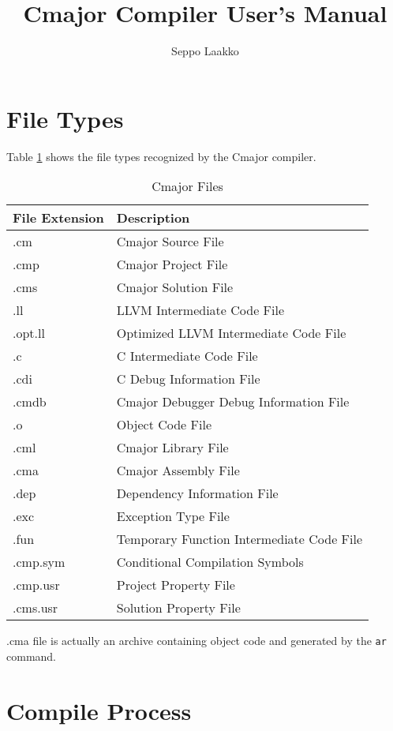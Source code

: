 \documentclass[oneside, a4paper, 11pt]{article}
\begin{document}
\title{Cmajor Compiler User's Manual}
\author{Seppo Laakko}
\maketitle

\section{File Types}

Table \ref{tab:files} shows the file types recognized by the Cmajor compiler.

\begin{table}[htb]
\caption{Cmajor Files}\label{tab:files}
\begin{tabular}{ll}
\textbf{File Extension} & \textbf{Description}\\
\hline
.cm & Cmajor Source File\\
.cmp & Cmajor Project File\\
.cms & Cmajor Solution File\\
.ll & LLVM Intermediate Code File\\
.opt.ll & Optimized LLVM Intermediate Code File\\
.c & C Intermediate Code File\\
.cdi & C Debug Information File\\
.cmdb & Cmajor Debugger Debug Information File\\
.o & Object Code File\\
.cml & Cmajor Library File\\
.cma & Cmajor Assembly File\\
.dep & Dependency Information File\\
.exc & Exception Type File\\
.fun & Temporary Function Intermediate Code File\\
.cmp.sym & Conditional Compilation Symbols\\
.cmp.usr & Project Property File\\
.cms.usr & Solution Property File\\
\end{tabular}
\end{table}

.cma file is actually an archive containing object code and generated by the \verb|ar| command.\\

\section{Compile Process}
\end{document}
